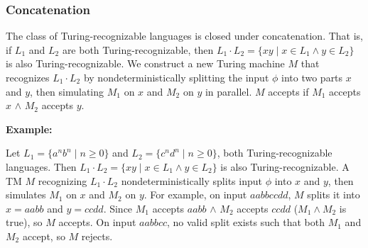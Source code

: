 \documentclass[12pt,a4paper,openany]{article}
\begin{document}
\begin{center}
\end{center}

\subsubsection{Concatenation}

The class of Turing-recognizable languages is closed under concatenation. 
That is, if $L_1$ and $L_2$ are both Turing-recognizable, then $L_1 \cdot L_2 = \{xy \mid x \in L_1 \land y \in L_2\}$ is also Turing-recognizable. 
We construct a new Turing machine $M$ that recognizes $L_1 \cdot L_2$ by nondeterministically splitting the input $\phi$ into two parts $x$ and $y$, then simulating $M_1$ on $x$ and $M_2$ on $y$ in parallel. 
$M$ accepts if $M_1$ accepts $x$ $\land$ $M_2$ accepts $y$.

\textbf{Example:}

Let $L_1 = \{a^n b^n \mid n \geq 0\}$ and $L_2 = \{c^n d^n \mid n \geq 0\}$, both Turing-recognizable languages. 
Then $L_1 \cdot L_2 = \{xy \mid x \in L_1 \land y \in L_2\}$ is also Turing-recognizable. A TM $M$ recognizing $L_1 \cdot L_2$ nondeterministically splits input $\phi$ into $x$ and $y$, then simulates $M_1$ on $x$ and $M_2$ on $y$. 
For example, on input $aabbccdd$, $M$ splits it into $x = aabb$ and $y = ccdd$. Since $M_1$ accepts $aabb$ $\land$ $M_2$ accepts $ccdd$ ($M_1 \land M_2$ is true), so $M$ accepts. On input $aabbcc$, no valid split exists such that both $M_1$ and $M_2$ accept, so $M$ rejects.
\end{document}
